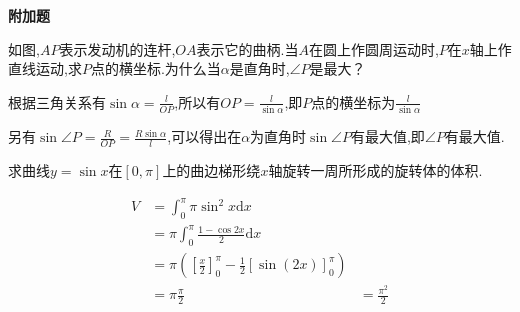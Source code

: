 \begin{questions}
\begin{solution}
	\end{solution}

	\begin{center}
		\large\bf 附加题
	\end{center}

	\question
	如图,$AP$表示发动机的连杆,$OA$表示它的曲柄.当$A$在圆上作圆周运动时,$P$在$x$轴上作直线运动,求$P$点的横坐标.为什么当$\alpha$是直角时,$\angle{P}$是最大？

	\begin{solution}
		根据三角关系有$\sin\alpha = \frac{l}{OP}$,所以有$OP =
			\frac{l}{\sin\alpha}$,即$P$点的横坐标为$\frac{l}{\sin\alpha}$

		另有$\sin\angle{P} = \frac{R}{OP} =
			\frac{R\sin\alpha}{l}$,可以得出在$\alpha$为直角时$\sin\angle{P}$有最大值,即$\angle{P}$有最大值.
	\end{solution}
	\question 求曲线$y=\sin{x}$在$[0,\pi]$上的曲边梯形绕$x$轴旋转一周所形成的旋转体的体积.
	\begin{solution}
		\begin{align*}
			V & = \int_0^{\pi}\pi \sin^2{x}\mathrm{d}x                              \\
			  & = \pi\int_0^{\pi}\frac{1-\cos{2x}}{2}\mathrm{d}x                    \\
			  & = \pi(\left[\frac{x}{2}\right]_0^{\pi} - \frac12[\sin(2x)]_0^{\pi}) \\
			  & = \pi\frac{\pi}{2}
			  & = \frac{\pi^2}{2}
		\end{align*}
	\end{solution}

\end{questions}
